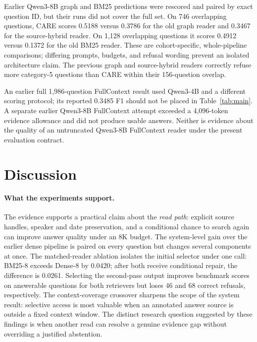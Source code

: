 \documentclass[11pt]{article}
\newcommand{\care}{\textsc{CARE}}
\begin{document}
Earlier Qwen3-8B graph and BM25 predictions were rescored and paired by
exact question ID, but their runs did not cover the full set. On 746
overlapping questions, \care{} scores 0.5188 versus 0.3786 for the old graph
reader and 0.3467 for the source-hybrid reader. On 1,128 overlapping
questions it scores 0.4912 versus 0.1372 for the old BM25 reader.
These are cohort-specific, whole-pipeline comparisons; differing prompts,
budgets, and refusal wording prevent an isolated architecture claim.
The previous graph and source-hybrid readers correctly refuse more
category-5 questions than \care{} within their 156-question overlap.

An earlier full 1,986-question FullContext result used Qwen3-4B and a
different scoring protocol; its reported 0.3485 F1 should not be placed in
Table~\ref{tab:main}. A separate earlier Qwen3-8B FullContext attempt
exceeded a 4,096-token evidence allowance and did not produce usable
answers. Neither is evidence about the quality of an untruncated
Qwen3-8B FullContext reader under the present evaluation contract.

\section{Discussion}
\label{sec:discussion}

\paragraph{What the experiments support.}
The evidence supports a practical claim about the \emph{read path}:
explicit source handles, speaker and date preservation, and a conditional
chance to search again can improve answer quality under an 8K budget.
The system-level gain over the earlier dense pipeline is paired on every
question but changes several components at once. The matched-reader ablation
isolates the initial selector under one call: BM25-8 exceeds Dense-8 by
0.0420; after both receive conditional repair, the difference is 0.0261.
Selecting the second-pass output improves benchmark scores on answerable
questions for both retrievers but loses 46 and 68 correct refusals,
respectively. The context-coverage
crossover sharpens the scope of the system result: selective access is most
valuable when an annotated answer source is outside a fixed context window.
The distinct research question suggested by these findings is when another
read can resolve a genuine evidence gap without overriding a justified
abstention.
\end{document}
